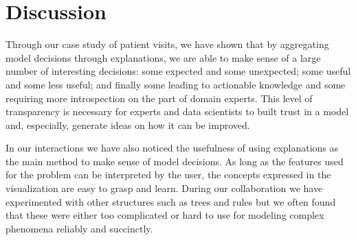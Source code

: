 \section{Discussion}
\label{sec:discussion}









Through our case study of patient visits, we have shown that by aggregating model decisions through explanations, we are able to make sense of a large number of interesting decisions: some expected and some unexpected; some useful and some less useful; and finally some leading to actionable knowledge and some requiring more introspection on the part of domain experts. This level of transparency is necessary for experts and data scientists to built trust in a model and, especially, generate ideas on how it can be improved.

In our interactions we have also noticed the usefulness of using explanations as the main method to make sense of model decisions. As long as the features used for the problem can be interpreted by the user, the concepts expressed in the visualization are easy to grasp and learn. During our collaboration we have experimented with other structures such as trees and rules but we often found that these were either too complicated or hard to use for modeling complex phenomena reliably and succinctly.

